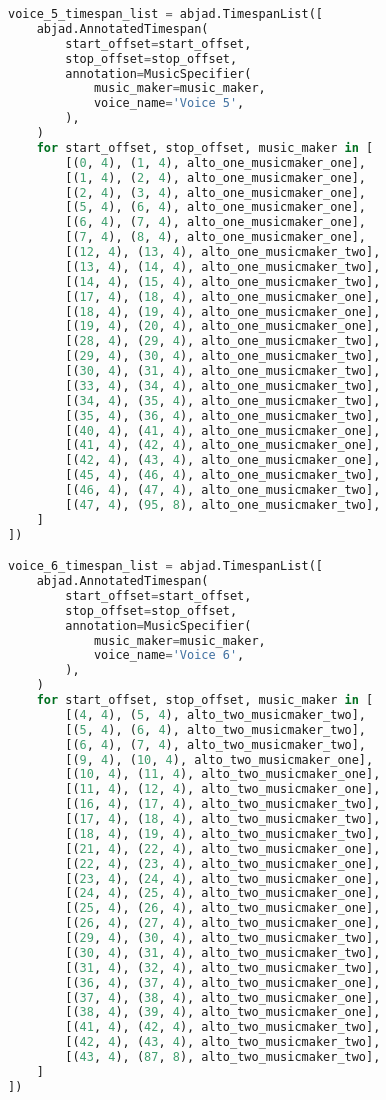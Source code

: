 \begin{lstlisting}[language=Python, caption=Invocation Source Code]
voice_5_timespan_list = abjad.TimespanList([
    abjad.AnnotatedTimespan(
        start_offset=start_offset,
        stop_offset=stop_offset,
        annotation=MusicSpecifier(
            music_maker=music_maker,
            voice_name='Voice 5',
        ),
    )
    for start_offset, stop_offset, music_maker in [
        [(0, 4), (1, 4), alto_one_musicmaker_one],
        [(1, 4), (2, 4), alto_one_musicmaker_one],
        [(2, 4), (3, 4), alto_one_musicmaker_one],
        [(5, 4), (6, 4), alto_one_musicmaker_one],
        [(6, 4), (7, 4), alto_one_musicmaker_one],
        [(7, 4), (8, 4), alto_one_musicmaker_one],
        [(12, 4), (13, 4), alto_one_musicmaker_two],
        [(13, 4), (14, 4), alto_one_musicmaker_two],
        [(14, 4), (15, 4), alto_one_musicmaker_two],
        [(17, 4), (18, 4), alto_one_musicmaker_one],
        [(18, 4), (19, 4), alto_one_musicmaker_one],
        [(19, 4), (20, 4), alto_one_musicmaker_one],
        [(28, 4), (29, 4), alto_one_musicmaker_two],
        [(29, 4), (30, 4), alto_one_musicmaker_two],
        [(30, 4), (31, 4), alto_one_musicmaker_two],
        [(33, 4), (34, 4), alto_one_musicmaker_two],
        [(34, 4), (35, 4), alto_one_musicmaker_two],
        [(35, 4), (36, 4), alto_one_musicmaker_two],
        [(40, 4), (41, 4), alto_one_musicmaker_one],
        [(41, 4), (42, 4), alto_one_musicmaker_one],
        [(42, 4), (43, 4), alto_one_musicmaker_one],
        [(45, 4), (46, 4), alto_one_musicmaker_two],
        [(46, 4), (47, 4), alto_one_musicmaker_two],
        [(47, 4), (95, 8), alto_one_musicmaker_two],
    ]
])

voice_6_timespan_list = abjad.TimespanList([
    abjad.AnnotatedTimespan(
        start_offset=start_offset,
        stop_offset=stop_offset,
        annotation=MusicSpecifier(
            music_maker=music_maker,
            voice_name='Voice 6',
        ),
    )
    for start_offset, stop_offset, music_maker in [
        [(4, 4), (5, 4), alto_two_musicmaker_two],
        [(5, 4), (6, 4), alto_two_musicmaker_two],
        [(6, 4), (7, 4), alto_two_musicmaker_two],
        [(9, 4), (10, 4), alto_two_musicmaker_one],
        [(10, 4), (11, 4), alto_two_musicmaker_one],
        [(11, 4), (12, 4), alto_two_musicmaker_one],
        [(16, 4), (17, 4), alto_two_musicmaker_two],
        [(17, 4), (18, 4), alto_two_musicmaker_two],
        [(18, 4), (19, 4), alto_two_musicmaker_two],
        [(21, 4), (22, 4), alto_two_musicmaker_one],
        [(22, 4), (23, 4), alto_two_musicmaker_one],
        [(23, 4), (24, 4), alto_two_musicmaker_one],
        [(24, 4), (25, 4), alto_two_musicmaker_one],
        [(25, 4), (26, 4), alto_two_musicmaker_one],
        [(26, 4), (27, 4), alto_two_musicmaker_one],
        [(29, 4), (30, 4), alto_two_musicmaker_two],
        [(30, 4), (31, 4), alto_two_musicmaker_two],
        [(31, 4), (32, 4), alto_two_musicmaker_two],
        [(36, 4), (37, 4), alto_two_musicmaker_one],
        [(37, 4), (38, 4), alto_two_musicmaker_one],
        [(38, 4), (39, 4), alto_two_musicmaker_one],
        [(41, 4), (42, 4), alto_two_musicmaker_two],
        [(42, 4), (43, 4), alto_two_musicmaker_two],
        [(43, 4), (87, 8), alto_two_musicmaker_two],
    ]
])


\end{lstlisting}
